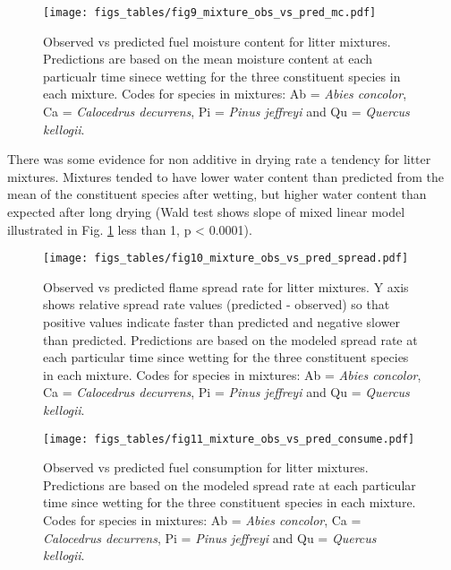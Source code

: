 \documentclass[fire,article,submit,moreauthors,pdftex]{Definitions/mdpi}
\begin{document}


\begin{figure}[H]
  \centering
\texttt{[image: figs\_tables/fig9\_mixture\_obs\_vs\_pred\_mc.pdf]}
\caption{Observed vs predicted fuel moisture content for litter mixtures. Predictions are based on the mean moisture content at each particualr time sinece wetting for the three constituent species in each mixture.  Codes for species in mixtures: Ab = \emph{Abies concolor}, Ca = \emph{Calocedrus decurrens}, Pi = \emph{Pinus jeffreyi} and Qu = \emph{Quercus kellogii}.}
  \label{fig:mixture_obs_pred_mc}
\end{figure}

There was some evidence for non additive in drying rate a tendency for litter mixtures. Mixtures tended to have lower water content than predicted from the mean of the constituent species after wetting, but higher water content than expected after long drying (Wald test shows slope of mixed linear model illustrated in Fig. \ref{fig:mixture_obs_pred_mc} less than 1, p < 0.0001).


\begin{figure}[H]
  \centering
\texttt{[image: figs\_tables/fig10\_mixture\_obs\_vs\_pred\_spread.pdf]}
\caption{Observed vs predicted flame spread rate for litter mixtures. Y axis shows relative spread rate values (predicted - observed) so that positive values indicate faster than predicted and negative slower than predicted. Predictions are based on the modeled spread rate at each particular time since wetting for the three constituent species in each mixture. Codes for species in mixtures: Ab = \emph{Abies concolor}, Ca = \emph{Calocedrus decurrens}, Pi = \emph{Pinus jeffreyi} and Qu = \emph{Quercus kellogii}.}
  \label{fig:mixture_obs_pred_spread}
\end{figure}


\begin{figure}[H]
  \centering
\texttt{[image: figs\_tables/fig11\_mixture\_obs\_vs\_pred\_consume.pdf]}
\caption{Observed vs predicted fuel consumption for litter mixtures. Predictions are based on the modeled spread rate at each particular time since wetting for the three constituent species in each mixture. Codes for species in mixtures: Ab = \emph{Abies concolor}, Ca = \emph{Calocedrus decurrens}, Pi = \emph{Pinus jeffreyi} and Qu = \emph{Quercus kellogii}.}
  \label{fig:mixture_obs_pred_consume}
\end{figure}
\end{document}
